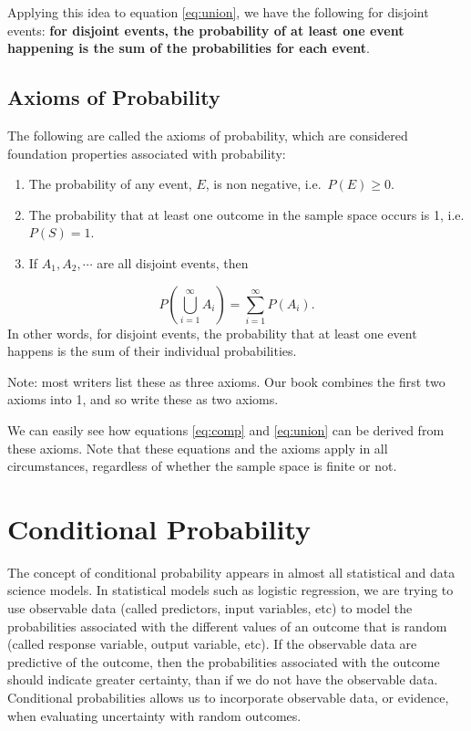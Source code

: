 \documentclass[
]{book}
\providecommand{\tightlist}{%
  \setlength{\itemsep}{0pt}\setlength{\parskip}{0pt}}
\begin{document}
Applying this idea to equation \eqref{eq:union}, we have the following for disjoint events: \textbf{for disjoint events, the probability of at least one event happening is the sum of the probabilities for each event}.

\subsection{Axioms of Probability}\label{axioms-of-probability}

The following are called the axioms of probability, which are considered foundation properties associated with probability:

\begin{enumerate}
\def\labelenumi{\arabic{enumi}.}
\tightlist
\item
  The probability of any event, \(E\), is non negative, i.e.~\(P(E) \geq 0\).
\item
  The probability that at least one outcome in the sample space occurs is 1, i.e.\(P(S) = 1\).
\item
  If \(A_1, A_2, \cdots\) are all disjoint events, then
\end{enumerate}

\[
P(\bigcup\limits_{i=1}^{\infty} A_{i}) = \sum_{i=1}^{\infty} P(A_i).
\]
In other words, for disjoint events, the probability that at least one event happens is the sum of their individual probabilities.

Note: most writers list these as three axioms. Our book combines the first two axioms into 1, and so write these as two axioms.

We can easily see how equations \eqref{eq:comp} and \eqref{eq:union} can be derived from these axioms. Note that these equations and the axioms apply in all circumstances, regardless of whether the sample space is finite or not.

\section{Conditional Probability}\label{condprob}

The concept of conditional probability appears in almost all statistical and data science models. In statistical models such as logistic regression, we are trying to use observable data (called predictors, input variables, etc) to model the probabilities associated with the different values of an outcome that is random (called response variable, output variable, etc). If the observable data are predictive of the outcome, then the probabilities associated with the outcome should indicate greater certainty, than if we do not have the observable data. Conditional probabilities allows us to incorporate observable data, or evidence, when evaluating uncertainty with random outcomes.
\end{document}
